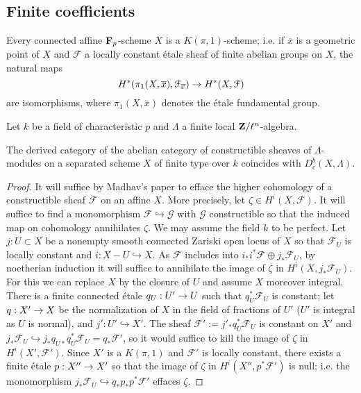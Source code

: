\documentclass[deligne.tex]{subfiles}
\begin{document}
\subsection{Finite coefficients}
\begin{theorem*}[Achinger]
	Every connected affine $\mathbf{F}_p$-scheme $X$ is a $K(\pi,1)$-scheme; i.e.
	if $\overline x$ is a geometric point of $X$ and $\mathcal F$ a locally
	constant étale sheaf of finite abelian groups on $X$, the natural maps
	\begin{equation*}
	H^*(\pi_1(X,\overline x),\mathcal F_{\overline x})\rightarrow H^*(X,\mathcal F)
	\end{equation*}
	are isomorphisms, where $\pi_1(X,\overline x)$ denotes the étale 
	fundamental group.
\end{theorem*}
Let $k$ be a field of characteristic $p$ and $\Lambda$ a finite local
$\mathbf{Z}/\ell^n$-algebra.
\begin{corollary*}
	The derived category of the abelian category of constructible sheaves of
	$\Lambda$-modules on a separated scheme $X$ of finite type over $k$
	coincides with $D_c^b(X,\Lambda)$.
\end{corollary*}
\begin{proof}
	It will suffice by Madhav's paper to efface the higher cohomology of a 
constructible sheaf $\mathcal F$ on an affine $X$.
More precisely, let $\zeta\in H^i(X,\mathcal F)$.
It will suffice to find a monomorphism $\mathcal F\hookrightarrow\mathcal G$
with $\mathcal G$ constructible so that the induced map on cohomology
annihilates $\zeta$. We may assume the field $k$ to be perfect.
Let $j:U\subset X$ be a nonempty smooth connected Zariski open locus
of $X$ so that $\mathcal F_U$ is locally constant and
$i:X-U\hookrightarrow X$.
As $\mathcal F$ includes into $i_*i^*\mathcal F\oplus j_*\mathcal F_U$, by
noetherian induction it will suffice to annihilate the image of $\zeta$ in
$H^i(X,j_*\mathcal F_U)$. For this we can replace $X$ by the closure of $U$
and assume $X$ moreover integral.
There is a finite connected étale $q_U:U'\rightarrow U$ such that
$q_U^*\mathcal F_U$ is constant; let $q:X'\rightarrow X$ be the normalization of $X$
in the field of fractions of $U'$ ($U'$ is integral as $U$ is normal),
and $j':U'\hookrightarrow X'$.
The sheaf $\mathcal F':=j'_*q_U^*\mathcal F_U$ is constant on $X'$ and
$j_*\mathcal F_U\hookrightarrow j_*q_{U*}q_U^*\mathcal F_U=q_*\mathcal F'$,
so it would  suffice to kill the image of $\zeta$ in $H^i(X',\mathcal F')$.
Since $X'$ is a $K(\pi,1)$ and $\mathcal F'$ is locally constant,
there exists a finite étale $p:X''\rightarrow X'$ so that the image of 
$\zeta$ in $H^i(X'',p^*\mathcal F')$ is null; i.e. the monomorphism
$j_*\mathcal F_U\hookrightarrow q_*p_*p^*\mathcal F'$ effaces $\zeta$.
\end{proof}
\end{document}
